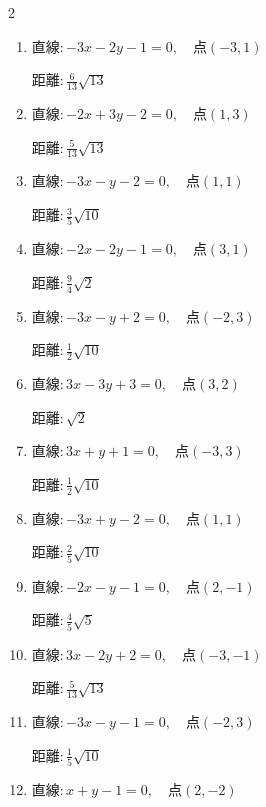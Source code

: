\begin{multicols}{2}
\begin{enumerate}
        $\displaystyle 距離 : \frac{2}{5}\sqrt{10}$

  \item $直線:-3x-2y-1=0,\quad 点 ( -3, 1 )$

        $\displaystyle 距離 : \frac{6}{13}\sqrt{13}$

  \item $直線:-2x+3y-2=0,\quad 点 ( 1, 3 )$

        $\displaystyle 距離 : \frac{5}{13}\sqrt{13}$

  \item $直線:-3x-y-2=0,\quad 点 ( 1, 1 )$

        $\displaystyle 距離 : \frac{3}{5}\sqrt{10}$

  \item $直線:-2x-2y-1=0,\quad 点 ( 3, 1 )$

        $\displaystyle 距離 : \frac{9}{4}\sqrt{2}$

\columnbreak %

\resetques

  \item $直線:-3x-y+2=0,\quad 点 ( -2, 3 )$

        $\displaystyle 距離 : \frac{1}{2}\sqrt{10}$

  \item $直線:3x-3y+3=0,\quad 点 ( 3, 2 )$

        $\displaystyle 距離 : \sqrt{2}$

  \item $直線:3x+y+1=0,\quad 点 ( -3, 3 )$

        $\displaystyle 距離 : \frac{1}{2}\sqrt{10}$

  \item $直線:-3x+y-2=0,\quad 点 ( 1, 1 )$

        $\displaystyle 距離 : \frac{2}{5}\sqrt{10}$

  \item $直線:-2x-y-1=0,\quad 点 ( 2, -1 )$

        $\displaystyle 距離 : \frac{4}{5}\sqrt{5}$

  \item $直線:3x-2y+2=0,\quad 点 ( -3, -1 )$

        $\displaystyle 距離 : \frac{5}{13}\sqrt{13}$

  \item $直線:-3x-y-1=0,\quad 点 ( -2, 3 )$

        $\displaystyle 距離 : \frac{1}{5}\sqrt{10}$

  \item $直線:x+y-1=0,\quad 点 ( 2, -2 )$


\end{enumerate}
\end{multicols}
